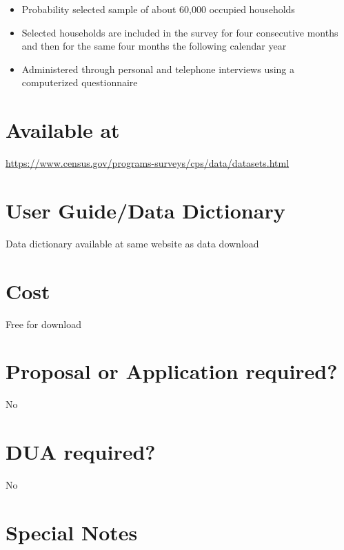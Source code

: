 \documentclass[
]{book}
\providecommand{\tightlist}{%
  \setlength{\itemsep}{0pt}\setlength{\parskip}{0pt}}
\begin{document}
\begin{itemize}
\tightlist
\item
  Probability selected sample of about 60,000 occupied households
\item
  Selected households are included in the survey for four consecutive months and then for the same four months the following calendar year
\item
  Administered through personal and telephone interviews using a computerized questionnaire
\end{itemize}

\hypertarget{available-at-21}{%
\section{Available at}\label{available-at-21}}

\url{https://www.census.gov/programs-surveys/cps/data/datasets.html}

\hypertarget{user-guidedata-dictionary-21}{%
\section{User Guide/Data Dictionary}\label{user-guidedata-dictionary-21}}

Data dictionary available at same website as data download

\hypertarget{cost-21}{%
\section{Cost}\label{cost-21}}

Free for download

\hypertarget{proposal-or-application-required-21}{%
\section{Proposal or Application required?}\label{proposal-or-application-required-21}}

No

\hypertarget{dua-required-21}{%
\section{DUA required?}\label{dua-required-21}}

No

\hypertarget{special-notes-21}{%
\section{Special Notes}\label{special-notes-21}}
\end{document}
